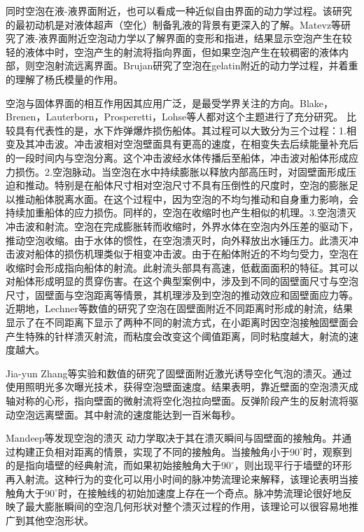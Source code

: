 同时空泡在液-液界面附近，也可以看成一种近似自由界面的动力学过程。该研究的最初动机是对液体超声（空化）制备乳液的背景有更深入的了解。Matevz等研究了液-液界面附近空泡动力学以了解界面的变形和指进，结果显示空泡产生在较轻的液体中时，空泡产生的射流将指向界面，但如果空泡产生在较稠密的液体内部，则空泡射流远离界面\cite{orthaber_cavitation_2020}。Brujan研究了空泡在gelatin附近的动力学过程，并着重的理解了杨氏模量的作用\cite{brujan_dynamics_2001}。

空泡与固体界面的相互作用因其应用广泛，是最受学界关注的方向。Blake，Brenen，Lauterborn，Prosperetti，Lohse等人都对这个主题进行了充分研究\cite{lohse_bubble_2018,lauterborn_physics_2010,blake_interaction_1993,brennen_cavitation_1995,Prosperetti2004}。
比较具有代表性的是，水下炸弹爆炸损伤船体。其过程可以大致分为三个过程：1.相变及其冲击波。冲击波相对空泡壁面具有更高的速度，在相变失去后续能量补充后的一段时间内与空泡分离。这个冲击波经水体传播后至船体，冲击波对船体形成应力损伤。2.空泡脉动。当空泡在水中持续膨胀以释放内部高压时，对固壁面形成压迫和推动。特别是在船体尺寸相对空泡尺寸不具有压倒性的尺度时，空泡的膨胀足以推动船体脱离水面。在这个过程中，因为空泡的不均匀推动和自身重力影响，会持续加重船体的应力损伤。同样的，空泡在收缩时也产生相似的机理。3.空泡溃灭冲击波和射流。空泡在完成膨胀转而收缩时，外界水体在空泡内外压差的驱动下，推动空泡收缩。由于水体的惯性，在空泡溃灭时，向外释放出水锤压力。此溃灭冲击波对船体的损伤机理类似于相变冲击波。由于在船体附近的不均匀受力，空泡在收缩时会形成指向船体的射流。此射流头部具有高速，低截面面积的特征。其可以对船体形成明显的贯穿伤害。在这个典型案例中，涉及到不同的固壁面尺寸与空泡尺寸，固壁面与空泡距离等情景，其机理涉及到空泡的推动效应和固壁面应力等。
近期地，Lechner等数值的研究了空泡在固壁面附近不同距离时形成的射流，结果显示了在不同距离下显示了两种不同的射流方式，在小距离时因空泡接触固壁面会产生特殊的针样溃灭射流，而粘度会改变这个阈值距离，同时粘度越大，射流的速度越大\cite{lechner_jet_2020,lechner_pressure_2017}。

Jia-yun Zhang等实验和数值的研究了固壁面附近激光诱导空化气泡的溃灭\cite{zhang_experimental_2022}。通过使用照明光多次曝光技术，获得空泡壁面速度。结果表明，靠近壁面的空泡溃灭成轴对称的心形，指向壁面的微射流将空化泡拉向壁面。反弹阶段产生的反射流将驱动空泡远离壁面。其中射流的速度能达到一百米每秒。

Mandeep等发现空泡的溃灭 动力学取决于其在溃灭瞬间与固壁面的接触角\cite{saini_dynamics_2022}。并通过构建正负相对距离的情景，实现了不同的接触角。当接触角小于$90^{\circ}$时，观察到的是指向墙壁的经典射流，而如果初始接触角大于$90^{\circ}$，则出现平行于墙壁的环形再入射流。这种行为的变化可以用小时间的脉冲势流理论来解释，该理论表明当接触角大于$90^{\circ}$时，在接触线的初始加速度上存在一个奇点。脉冲势流理论很好地反映了最大膨胀瞬间的空泡几何形状对整个溃灭过程的作用，该理论可以很容易地推广到其他空泡形状。

